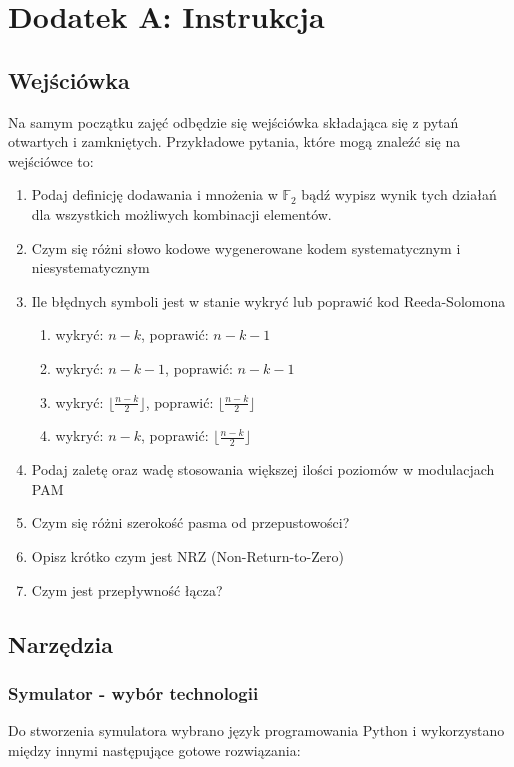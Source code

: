\setcounter{secnumdepth}{0}
\section*{Dodatek A: Instrukcja}\label{zajecia-dydaktyczne}

\subsection{Wejściówka}

Na samym początku zajęć odbędzie się wejściówka składająca się z pytań otwartych
i zamkniętych.
Przykładowe pytania, które mogą znaleźć się na wejściówce to:

\begin{enumerate}
    \item Podaj definicję dodawania i mnożenia w $\mathbb{F}_2$ bądź wypisz wynik tych
    działań dla wszystkich możliwych kombinacji elementów.
    \item Czym się różni słowo kodowe wygenerowane kodem systematycznym i niesystematycznym
    \item Ile błędnych symboli jest w stanie wykryć lub poprawić kod Reeda-Solomona
    \begin{enumerate}[label=\Alph*:]
        \item wykryć: $n-k$, poprawić: $n-k-1$
        \item wykryć: $n-k-1$, poprawić: $n-k-1$
        \item wykryć: $\lfloor \frac{n-k}{2} \rfloor$, poprawić: $\lfloor \frac{n-k}{2} \rfloor$
        \item wykryć: $n-k$, poprawić: $\lfloor \frac{n-k}{2} \rfloor$
    \end{enumerate}
    \item Podaj zaletę oraz wadę stosowania większej ilości poziomów w modulacjach PAM
    \item Czym się różni szerokość pasma od przepustowości?
    \item Opisz krótko czym jest NRZ (Non-Return-to-Zero)
    \item Czym jest przepływność łącza?
\end{enumerate}

\subsection{Narzędzia}

\subsubsection{Symulator - wybór technologii}
Do stworzenia symulatora wybrano język programowania Python i wykorzystano między innymi następujące gotowe rozwiązania:


